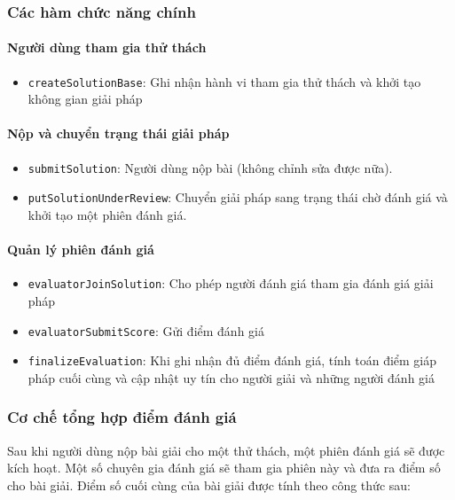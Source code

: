 \subsubsection{Các hàm chức năng chính}

\paragraph{Người dùng tham gia thử thách}

\begin{itemize}
  \item \texttt{createSolutionBase}: Ghi nhận hành vi tham gia thử thách và khởi tạo không gian giải pháp
\end{itemize}

\paragraph{Nộp và chuyển trạng thái giải pháp}

\begin{itemize}
  \item \texttt{submitSolution}: Người dùng nộp bài (không chỉnh sửa được nữa).
  \item \texttt{putSolutionUnderReview}: Chuyển giải pháp sang trạng thái chờ đánh giá và khởi tạo một phiên đánh giá.
\end{itemize}

\paragraph{Quản lý phiên đánh giá}

\begin{itemize}
  \item \texttt{evaluatorJoinSolution}: Cho phép người đánh giá tham gia đánh giá giải pháp
  \item \texttt{evaluatorSubmitScore}: Gửi điểm đánh giá
  \item \texttt{finalizeEvaluation}: Khi ghi nhận đủ điểm đánh giá, tính toán điểm giáp pháp cuối cùng và cập nhật uy tín cho người giải và những người đánh giá
\end{itemize}

\subsubsection{Cơ chế tổng hợp điểm đánh giá}

Sau khi người dùng nộp bài giải cho một thử thách, một phiên đánh giá sẽ được kích hoạt. Một số chuyên gia đánh giá sẽ tham gia phiên này và đưa ra điểm số cho bài giải. Điểm số cuối cùng của bài giải được tính theo công thức sau:

